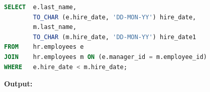 \begin{frame}



\begin{lstlisting}[language=SQL]
SELECT 	e.last_name,
       	TO_CHAR (e.hire_date, 'DD-MON-YY') hire_date,
       	m.last_name,
       	TO_CHAR (m.hire_date, 'DD-MON-YY') hire_date1
FROM 	hr.employees e
JOIN 	hr.employees m ON (e.manager_id = m.employee_id)
WHERE 	e.hire_date < m.hire_date;
\end{lstlisting}
\textbf{Output: }
\end{frame}


